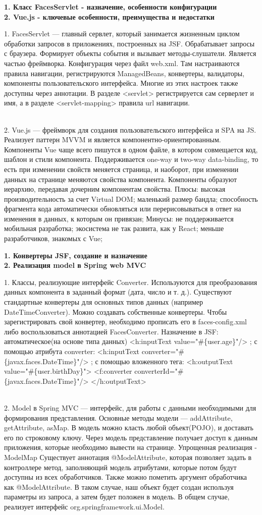 \documentclass{article}
\newcommand{\bil}[4]{%
    \begin{minipage}{.3\textwidth}
        \textbf{1. #1} \\
        \textbf{2. #2}

        1. #3
        \\
        2. #4
    \end{minipage}
}
\begin{document}
\bil{Класс FacesServlet - назначение, особенности конфигурации}{Vue.js - ключевые особенности, преимущества и недостатки}{
    FacesServlet — главный сервлет, который занимается жизненным циклом обработки запросов в приложениях, построенных на JSF. Обрабатывает запросы с браузера.
    Формирует объекты события и вызывает методы-слушатели. Является частью фреймворка. Конфигурация через файл web.xml.
    Там настраиваются правила навигации, регистрируются ManagedBeans, конвертеры, валидаторы, компоненты пользовательского интерфейса. 
    Многие из этих настроек также доступны через аннотации.
    В разделе <servlet> регистрируется сам серверлет и имя, а в разделе <servlet-mapping> правила url навигации.
}{
    Vue.js — фреймворк для создания пользовательского интерфейса и SPA на JS. 
    Реализует паттерн MVVM и является компонентно-ориентированным.
    Компоненты Vue чаще всего пишутся в одном файле, в котором совмещается код, шаблон и стили компонента. 
    Поддерживается one-way и two-way data-binding, то есть при изменении свойств меняется страница, и наоборот, при изменении данных на странице меняются свойства компонента. 
    Компоненты образуют иерархию, передавая дочерним компонентам свойства.
    Плюсы: высокая производительность за счет Virtual DOM; маленький размер бандла;
    способность фрагмента кода автоматически обновляться или перерисовываться в ответ на изменения в данных, к которым он привязан;
    Минусы: не поддерживается мобильная разработка; экосистема не так развита, как у React; меньше разработчиков, знакомых с Vue;
}
\hfill
\bil{Конвертеры JSF, создание и назначение}{Реализация model в Spring web MVC}{
    Классы, реализующие интерфейс Converter. 
    Используются для преобразования данных компонента в заданный формат (дата, число и т. д.).
    Существуют стандартные конвертеры для основных типов данных (например DateTimeConverter).
    Можно создавать собственные конвертеры.
    Чтобы зарегистрировать свой конвертер, необходимо прописать его в faces-config.xml либо воспользоваться аннотацией FacesConverter.
    Назначение в JSF: автоматическое(на основе типа данных) 
    <h:inputText value="\#\{user.age\}"/>
    ; с помощью атрибута converter:
<h:inputText converter="\#\{javax.faces.DateTime\}"/>
    ; с помощью вложенного тега:
    <h:outputText value="\#\{user.birthDay\}"> <f:converter
converterId="\#\{javax.faces.DateTime\}"/> </h:outputText>
}{
    Model в Spring MVC — интерфейс, для работы с данными необходимыми для формирования представления. 
    Основные методы модели — addAttribute, getAttribute, asMap. В модель можно класть любой объект(POJO), и доставать его по строковому ключу. 
    Через модель представление получает доступ к данным приложения, которые необходимо вывести на странице.
Упрощенная реализация - ModelMap
    Существует аннотация @ModelAttribute, которая позволяет задать в контроллере метод, заполняющий модель атрибутами, которые потом будут доступны из всех обработчиков. 
    Также можно пометить аргумент обработчика как @ModelAttribute. В таком случае, наш объект будет создан используя параметры из запроса, а затем будет положен в модель.
    В общем случае, реализует интерфейс org.springframework.ui.Model.

}
\end{document}
